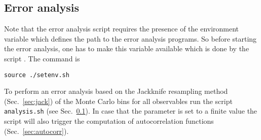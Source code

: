 \subsection{Error analysis}\label{sec:analysis}
%


Note that the error analysis script requires the presence of the environment variable  which defines the path to the error analysis programs.
So before starting the error analysis, one has to make this variable available which is done by the script . The command is
\begin{verbatim}
source ./setenv.sh
\end{verbatim}
To perform an error analysis based on the Jackknife resampling method (Sec.~\ref{sec:jack})  of the Monte Carlo bins for all observables run the script \texttt{analysis.sh} 
(see Sec.~\ref{sec:analysis}). In case that the parameter  is set to a finite value the script will also trigger the computation of autocorrelation functions (Sec.~\ref{sec:autocorr}).



